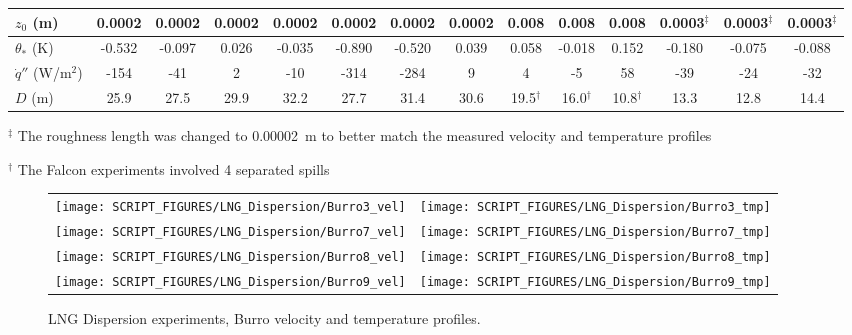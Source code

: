 \begin{sidewaystable}[p]
\begin{center}
\begin{tabular}{|l|c|c|c|c|c|c|c|c|c|c|c|c|c|}
$z_0$ (m)                      & 0.0002 & 0.0002 & 0.0002 & 0.0002 & 0.0002 & 0.0002 & 0.0002      & 0.008       & 0.008       & 0.008             & 0.0003$^\ddag$  & 0.0003$^\ddag$ & 0.0003$^\ddag$  \\ \hline
$\theta_*$ (K)                 & -0.532 & -0.097 & 0.026  & -0.035 & -0.890 & -0.520 & 0.039       & 0.058       & -0.018      & 0.152             & -0.180          & -0.075         & -0.088  \\ \hline
$\dot{q}''$ (W/m$^2$)          & -154   & -41    & 2      & -10    & -314   & -284   & 9           & 4           & -5          & 58                & -39             & -24            & -32     \\ \hline
$D$ (m)                        & 25.9   & 27.5   & 29.9   & 32.2   & 27.7   & 31.4   & 30.6        & 19.5$^\dag$ & 16.0$^\dag$ & 10.8$^\dag$       & 13.3            & 12.8           & 14.4    \\ \hline
\end{tabular}
\end{center}
$^\ddag$ The roughness length was changed to 0.00002~m to better match the measured velocity and temperature profiles

$^\dag$ The Falcon experiments involved 4 separated spills
\label{tab:LNG_Dispersion}
\end{sidewaystable}

\begin{figure}[p]
\begin{tabular*}{\textwidth}{l@{\extracolsep{\fill}}r}
\texttt{[image: SCRIPT\_FIGURES/LNG\_Dispersion/Burro3\_vel]} &
\texttt{[image: SCRIPT\_FIGURES/LNG\_Dispersion/Burro3\_tmp]} \\
\texttt{[image: SCRIPT\_FIGURES/LNG\_Dispersion/Burro7\_vel]} &
\texttt{[image: SCRIPT\_FIGURES/LNG\_Dispersion/Burro7\_tmp]} \\
\texttt{[image: SCRIPT\_FIGURES/LNG\_Dispersion/Burro8\_vel]} &
\texttt{[image: SCRIPT\_FIGURES/LNG\_Dispersion/Burro8\_tmp]} \\
\texttt{[image: SCRIPT\_FIGURES/LNG\_Dispersion/Burro9\_vel]} &
\texttt{[image: SCRIPT\_FIGURES/LNG\_Dispersion/Burro9\_tmp]}
\end{tabular*}
\caption[LNG Dispersion experiments, Burro velocity and temperature profiles]{LNG Dispersion experiments, Burro velocity and temperature profiles.}
\label{LNG_Dispersion_Burro_profiles}
\end{figure}

